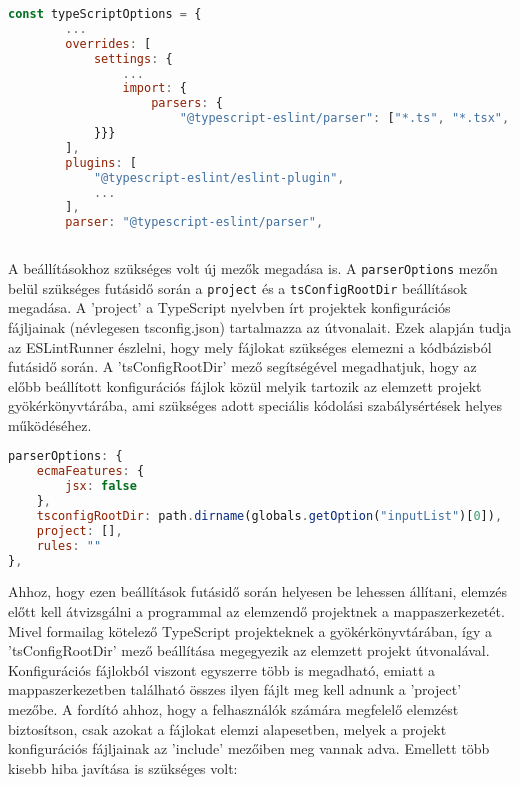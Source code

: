 \begin{lstlisting}[caption={Elemző és bővítmény megadása},label={lst:tsconfig}, language={JavaScript}]
    const typeScriptOptions = {
        ...
        overrides: [
            settings: {
                ...
                import: {
                    parsers: {
                        "@typescript-eslint/parser": ["*.ts", "*.tsx", "*.js", "*.jsx"],
            }}}
        ],
        plugins: [
            "@typescript-eslint/eslint-plugin",
            ...
        ],
        parser: "@typescript-eslint/parser",
    
    \end{lstlisting}

A beállításokhoz szükséges volt új mezők megadása is. A \texttt{parserOptions} mezőn belül szükséges futásidő során a \texttt{project} és a \texttt{tsConfigRootDir} beállítások megadása. A 'project' a TypeScript nyelvben írt projektek konfigurációs fájljainak (névlegesen tsconfig.json) tartalmazza az útvonalait. Ezek alapján tudja az ESLintRunner észlelni, hogy mely fájlokat szükséges elemezni a kódbázisból futásidő során. A 'tsConfigRootDir' mező segítségével megadhatjuk, hogy az előbb beállított konfigurációs fájlok közül melyik tartozik az elemzett projekt gyökérkönyvtárába, ami szükséges adott speciális kódolási szabálysértések helyes működéséhez.

\begin{lstlisting}[caption={Szabálysértések megadása .json állományban},label={lst:jsonconfig}, language={JavaScript}]
parserOptions: {
    ecmaFeatures: {
        jsx: false
    },
    tsconfigRootDir: path.dirname(globals.getOption("inputList")[0]),
    project: [],
    rules: ""
},
\end{lstlisting}

Ahhoz, hogy ezen beállítások futásidő során helyesen be lehessen állítani, elemzés előtt kell átvizsgálni a programmal az elemzendő projektnek a mappaszerkezetét. Mivel formailag kötelező TypeScript projekteknek a gyökérkönyvtárában, így a 'tsConfigRootDir' mező beállítása megegyezik az elemzett projekt útvonalával. Konfigurációs fájlokból viszont egyszerre több is megadható, emiatt a mappaszerkezetben található összes ilyen fájlt meg kell adnunk a 'project' mezőbe. 
A fordító ahhoz, hogy a felhasználók számára megfelelő elemzést biztosítson, csak azokat a fájlokat elemzi alapesetben, melyek a projekt konfigurációs fájljainak az 'include' mezőiben meg vannak adva. Emellett több kisebb hiba javítása is szükséges volt:


